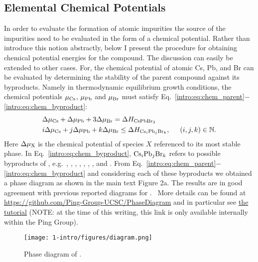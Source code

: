 \subsection{Elemental Chemical Potentials}
In order to evaluate the formation of atomic impurities the source of the impurities need to be evaluated in the form of a chemical potential. Rather than introduce this notion abstractly, below I present the procedure for obtaining chemical potential energies for the  compound. The discussion can easily be extended to other cases.
For,  the chemical potential of atomic Cs, Pb, and Br can be evaluated by determining the stability of the parent compound  against its byproducts.
Namely in thermodynamic equilibrium growth conditions, the chemical potentials $\mu_{\rm Cs}$, $\mu_{\rm Pb}$ and $\mu_{\rm Br}$ must satisfy Eq.~\ref{intro:eq:chem_parent}$-$\ref{intro:eq:chem_byproduct}:
\begin{align}
    & \Delta \mu_{\rm Cs} + \Delta \mu_{\rm Pb} + 3\Delta \mu_{\rm Br} = \Delta H_{\ce{CsPbBr3}} \label{intro:eq:chem_parent} \\
    & i\Delta \mu_{\rm Cs} + j\Delta \mu_{\rm Pb} + k\Delta \mu_{\rm Br} \leq \Delta H_{ {\rm Cs}_i {\rm Pb}_j {\rm Br}_k}, \hspace{0.5cm} (i, j, k) \in \mathbb{N}. \label{intro:eq:chem_byproduct}
\end{align}
Here $\Delta \mu_{\rm X}$ is the chemical potential of species $X$ referenced to its most stable phase.
In Eq.~\ref{intro:eq:chem_byproduct}, ${\rm Cs}_i {\rm Pb}_j {\rm Br}_k$ refers to possible byproducts of , e.g.\ , , , , , , , and .
From Eq.~\ref{intro:eq:chem_parent}$-$\ref{intro:eq:chem_byproduct} and considering each of these byproducts we obtained a phase diagram as shown in the main text Figure 2a. The results are in good agreement with previous reported diagrams for .~\cite{kang2017high,li2019sodium}
More details can be found at \url{https://github.com/Ping-Group-UCSC/PhaseDiagram} and in particular see \href{https://github.com/Ping-Group-UCSC/PhaseDiagram/blob/main/Examples/CsPbBr3-PhaseDiagram/diagram.ipynb}{the  tutorial} (NOTE: at the time of this writing, this link is only available internally within the Ping Group).

\begin{figure}[h]
\begin{center}
\texttt{[image: 1-intro/figures/diagram.png]}
    \caption{Phase diagram of .}  \label{intro:fig:mean}
\end{center}
\end{figure}


